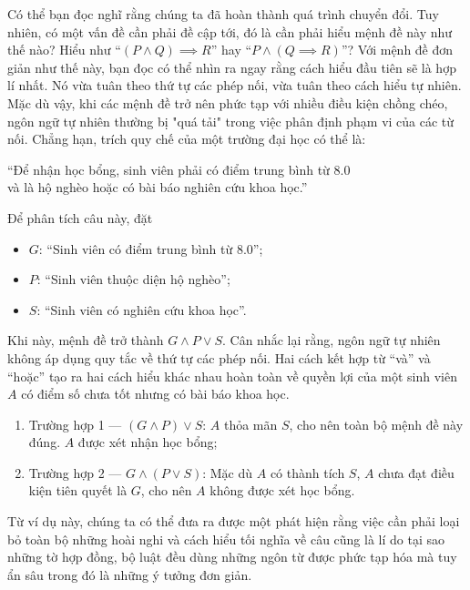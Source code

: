 Có thể bạn đọc nghĩ rằng chúng ta đã hoàn thành quá trình chuyển đổi. Tuy nhiên, có một vấn đề cần phải đề cập tới, đó là cần phải hiểu mệnh đề này như thế nào? Hiểu như
``$
(P \land Q) \implies R
$''
hay
``$
P \land (Q \implies R)
$''? Với mệnh đề đơn giản như thế này, bạn đọc có thể nhìn ra ngay rằng cách hiểu đầu tiên sẽ là hợp lí nhất. Nó vừa tuân theo thứ tự các phép nối, vừa tuân theo cách hiểu tự nhiên. Mặc dù vậy, khi các mệnh đề trở nên phức tạp với nhiều điều kiện chồng chéo, ngôn ngữ tự nhiên thường bị "quá tải" trong việc phân định phạm vi của các từ nối. Chẳng hạn, trích quy chế của một trường đại học có thể là:
\begin{center}
    ``Để nhận học bổng, sinh viên phải có điểm trung bình từ \num{8.0} \\và là hộ nghèo hoặc có bài báo nghiên cứu khoa học.''
\end{center}
Để phân tích câu này, đặt
\begin{itemize}
    \item $G$: ``Sinh viên có điểm trung bình từ \num{8.0}'';
    \item $P$: ``Sinh viên thuộc diện hộ nghèo'';
    \item $S$: ``Sinh viên có nghiên cứu khoa học''.
\end{itemize}
Khi này, mệnh đề trở thành $G \land P \lor S$. Cân nhắc lại rằng, ngôn ngữ tự nhiên không áp dụng quy tắc về thứ tự các phép nối. Hai cách kết hợp từ ``và'' và ``hoặc'' tạo ra hai cách hiểu khác nhau hoàn toàn về quyền lợi của một sinh viên $A$ có điểm số chưa tốt nhưng có bài báo khoa học.
\begin{enumerate}
    \item \textcolor{colorEmphasisCyan}{Trường hợp 1 --- $(G \land P) \lor S$}: $A$ thỏa mãn $S$, cho nên toàn bộ mệnh đề này đúng. $A$ được xét nhận học bổng;
    \item \textcolor{colorEmphasis}{Trường hợp 2 --- $G \land (P \lor S)$}: Mặc dù $A$ có thành tích $S$, $A$ chưa đạt điều kiện tiên quyết là $G$, cho nên $A$ không được xét học bổng.
\end{enumerate}
Từ ví dụ này, chúng ta có thể đưa ra được một phát hiện rằng việc cần phải loại bỏ toàn bộ những hoài nghi và cách hiểu tối nghĩa về câu cũng là lí do tại sao những tờ hợp đồng, bộ luật đều dùng những ngôn từ được phức tạp hóa mà tuy ẩn sâu trong đó là những ý tưởng đơn giản.

